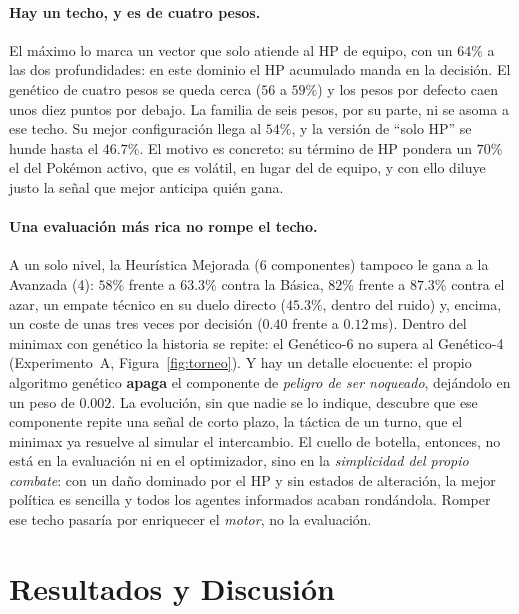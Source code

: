 \documentclass[11pt]{article}
\begin{document}
\paragraph{Hay un techo, y es de cuatro pesos.} El máximo lo marca un vector que
solo atiende al HP de equipo, con un $64\%$ a las dos profundidades: en este dominio
el HP acumulado manda en la decisión. El genético de cuatro pesos se queda cerca
($56$ a $59\%$) y los pesos por defecto caen unos diez puntos por debajo. La familia
de seis pesos, por su parte, ni se asoma a ese techo. Su mejor configuración llega
al $54\%$, y la versión de ``solo HP'' se hunde hasta el $46.7\%$. El motivo es
concreto: su término de HP pondera un $70\%$ el del Pokémon activo, que es volátil,
en lugar del de equipo, y con ello diluye justo la señal que mejor anticipa quién
gana.

\paragraph{Una evaluación más rica no rompe el techo.} A un solo nivel, la
Heurística Mejorada (6 componentes) tampoco le gana a la Avanzada (4): $58\%$ frente
a $63.3\%$ contra la Básica, $82\%$ frente a $87.3\%$ contra el azar, un empate
técnico en su duelo directo ($45.3\%$, dentro del ruido) y, encima, un coste de unas
tres veces por decisión ($0.40$ frente a $0.12$\,ms). Dentro del minimax con
genético la historia se repite: el Genético-6 no supera al Genético-4
(Experimento~A, Figura~\ref{fig:torneo}). Y hay un detalle elocuente: el propio
algoritmo genético \textbf{apaga} el componente de \emph{peligro de ser noqueado},
dejándolo en un peso de $0.002$. La evolución, sin que nadie se lo indique, descubre
que ese componente repite una señal de corto plazo, la táctica de un turno, que el
minimax ya resuelve al simular el intercambio. El cuello de botella, entonces, no
está en la evaluación ni en el optimizador, sino en la \emph{simplicidad del propio
combate}: con un daño dominado por el HP y sin estados de alteración, la mejor
política es sencilla y todos los agentes informados acaban rondándola. Romper ese
techo pasaría por enriquecer el \emph{motor}, no la evaluación.

\section{Resultados y Discusión}
\end{document}
